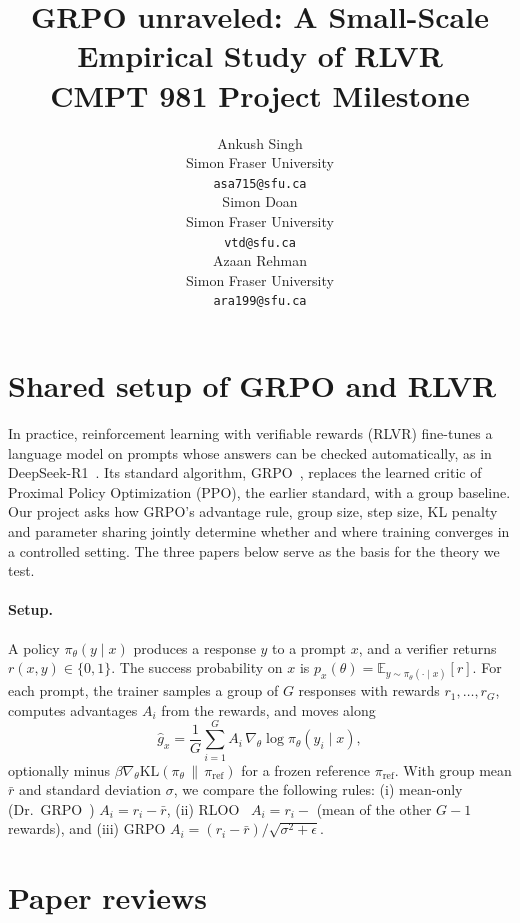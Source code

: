 \documentclass{article}
\title{GRPO unraveled: A Small-Scale Empirical Study of RLVR\\
  CMPT 981 Project Milestone}
\author{%
  Ankush Singh\\
  Simon Fraser University\\
  \texttt{asa715@sfu.ca} \\
  \And
  Simon Doan\\
  Simon Fraser University\\
  \texttt{vtd@sfu.ca} \\
  \And
  Azaan Rehman\\
  Simon Fraser University\\
  \texttt{ara199@sfu.ca} \\
}
\theoremstyle{definition}
\newcommand{\E}{\mathbb{E}}
\newcommand{\1}{\mathbf{1}}
\newcommand{\KL}{\mathrm{KL}}
\newcommand{\piref}{\pi_{\mathrm{ref}}}
\begin{document}
\maketitle

\section{Shared setup of GRPO and RLVR}
\label{sec:intro}

In practice, reinforcement learning with verifiable rewards (RLVR)
fine-tunes a language model on prompts whose answers can be checked
automatically, as in DeepSeek-R1~\citep{guo2025deepseekr1}. Its standard
algorithm, GRPO~\citep{shao2024deepseekmath}, replaces the learned critic
of Proximal Policy Optimization (PPO), the earlier standard, with a group baseline.
Our project asks how GRPO's advantage rule, group size,
step size, KL penalty and parameter sharing jointly determine whether and
where training converges in a controlled setting. The three
papers below serve as the basis for the theory we test.

\paragraph{Setup.} A policy $\pi_\theta(y\mid x)$ produces a response $y$
to a prompt $x$, and a verifier returns $r(x,y)\in\{0,1\}$. The success
probability on $x$ is $p_x(\theta)=\E_{y\sim\pi_\theta(\cdot\mid x)}[r]$.
For each prompt, the trainer samples a group of $G$ responses with
rewards $r_1,\dots,r_G$, computes advantages $A_i$ from the rewards, and
moves along
\[
  \widehat g_x=\frac1G\sum_{i=1}^G A_i\,\nabla_\theta\log\pi_\theta(y_i\mid x),
\]
optionally minus $\beta\nabla_\theta\KL(\pi_\theta\,\|\,\piref)$ for a
frozen reference $\piref$. With group mean $\bar r$ and standard
deviation $\sigma$, we compare the following rules: (i) mean-only (Dr.\
GRPO~\citep{liu2025drgrpo}) $A_i=r_i-\bar r$, (ii) RLOO~\citep{ahmadian2024rloo}
$A_i=r_i-$ (mean of the other $G-1$ rewards), and (iii) GRPO
$A_i=(r_i-\bar r)/\sqrt{\sigma^2+\epsilon}$.

\section{Paper reviews}
\label{sec:reviews}

\end{document}
